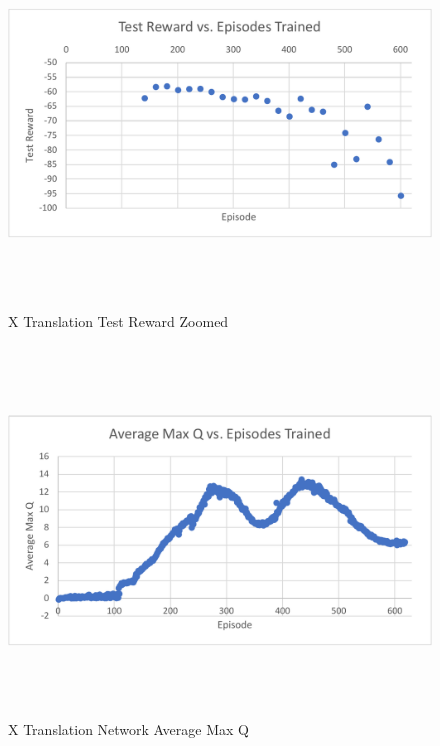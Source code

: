 \begin{figure}[H]
	\centering
	\includegraphics[width=6in, height=3.85in, keepaspectratio]{figures/train_figs/x_rzoom.pdf}
	\caption{X Translation Test Reward Zoomed} \label{fig:x_rzoom}
\end{figure}
\begin{figure}[H]
	\centering
	\includegraphics[width=6in, height=3.85in, keepaspectratio]{figures/train_figs/x_q.pdf}
	\caption{X Translation Network Average Max Q} \label{fig:x_q}
\end{figure}

